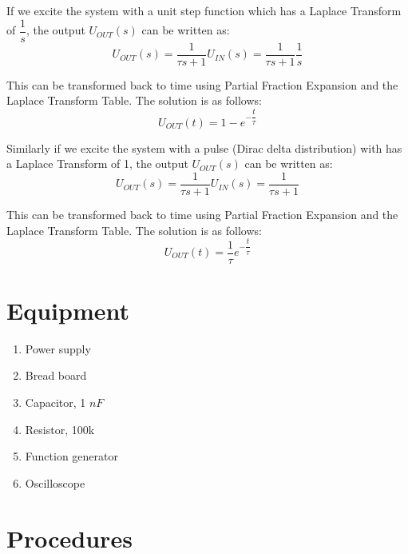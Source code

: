 \documentclass[11pt,letterpaper]{article}
\begin{document}
If we excite the system with a unit step function which has a Laplace Transform of $\dfrac{1}{s}$, the output $U_{OUT}(s)$  can be written as:
\begin{equation} \label{Eqn:StepResponseFirstOrderSystem5}
U_{OUT}(s) = \dfrac{1}{\tau s + 1}U_{IN}(s) = \dfrac{1}{\tau s + 1} \dfrac{1}{s}
\end{equation}

This can be transformed back to time using Partial Fraction Expansion and the Laplace Transform Table. The solution is as follows:
\begin{equation} \label{Eqn:StepResponseFirstOrderSystem6}
U_{OUT}(t) = 1 - e^{-\dfrac{t}{\tau}}
\end{equation}

Similarly if we excite the system with a pulse (Dirac delta distribution) with has a Laplace Transform of 1, the output $U_{OUT}(s)$ can be written as:
\begin{equation} \label{Eqn:StepResponseFirstOrderSystem7}
U_{OUT}(s) = \dfrac{1}{\tau s + 1}U_{IN}(s) = \dfrac{1}{\tau s + 1}
\end{equation}

This can be transformed back to time using Partial Fraction Expansion and the Laplace Transform Table. The solution is as follows:
\begin{equation} \label{Eqn:StepResponseFirstOrderSystem8}
U_{OUT}(t) = \dfrac{1}{\tau} e^{-\dfrac{t}{\tau}}
\end{equation}

\section{Equipment}

\begin{enumerate}
\item Power supply
\item Bread board
\item Capacitor, 1 $nF$
\item Resistor, 100k
\item Function generator
\item Oscilloscope
\end{enumerate}

\section{Procedures}
\end{document}
